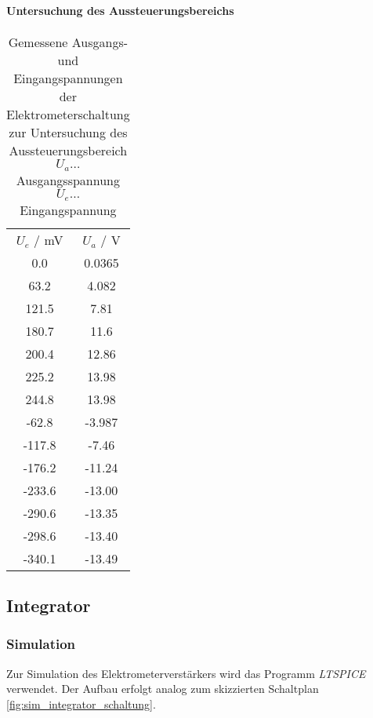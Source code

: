 \documentclass[12pt,english,ngerman]{scrartcl}
\begin{document}
\paragraph{Untersuchung des Aussteuerungsbereichs} \label{sec:Versuchohnekond}


\begin{table}[H]
  \caption{Gemessene Ausgangs- und Eingangspannungen der Elektrometerschaltung
  zur Untersuchung des Aussteuerungsbereich\\
  $U_a \dots$ Ausgangsspannung \\
  $U_e \dots$ Eingangspannung \\
  }
  \label{tab:mess_elektro_aussteurerung}
  \centering
    \begin{tabular}[c]{S|S}
      {$U_e$ / \si{\milli\volt}} & {$U_a$ / \si{\volt}} \\
      0.0 & 0.0365 \\
      63.2 & 4.082 \\
      121.5 & 7.81 \\
      180.7 & 11.6 \\
      200.4 & 12.86 \\
      225.2 & 13.98 \\
      244.8 & 13.98 \\
      -62.8 & -3.987 \\
      -117.8 & -7.46 \\
      -176.2 & -11.24 \\
      -233.6 & -13.00 \\
      -290.6 & -13.35 \\
      -298.6 & -13.40 \\
      -340.1 & -13.49 \\
    \end{tabular}
\end{table}



\subsection{Integrator}

\subsubsection{Simulation}
Zur Simulation des Elektrometerverstärkers wird das Programm
\textit{LTSPICE} verwendet. Der Aufbau erfolgt analog zum skizzierten
Schaltplan \autoref{fig:sim_integrator_schaltung}. 
\end{document}
